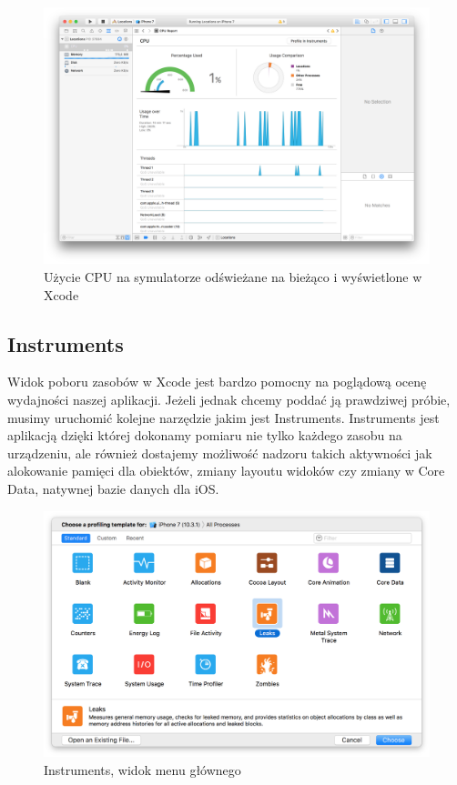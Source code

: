 \begin{figure}[ht!]
  \centering
  \includegraphics[width=120mm]{images/chapter-2-image-5-debugger.png}
  \caption{Użycie CPU na symulatorze odświeżane na bieżąco i wyświetlone w Xcode}
\end{figure}

\subsection{Instruments}

Widok poboru zasobów w Xcode jest bardzo pomocny na poglądową ocenę wydajności naszej aplikacji. Jeżeli jednak chcemy poddać ją prawdziwej próbie, musimy uruchomić kolejne narzędzie jakim jest Instruments. Instruments jest aplikacją dzięki której dokonamy pomiaru nie tylko każdego zasobu na urządzeniu, ale również dostajemy możliwość nadzoru takich aktywności jak alokowanie pamięci dla obiektów, zmiany layoutu widoków czy zmiany w Core Data, natywnej bazie danych dla iOS.

\begin{figure}[ht!]
  \centering
  \includegraphics[width=120mm]{images/chapter-2-image-6-instruments.png}
  \caption{Instruments, widok menu głównego}
\end{figure}

